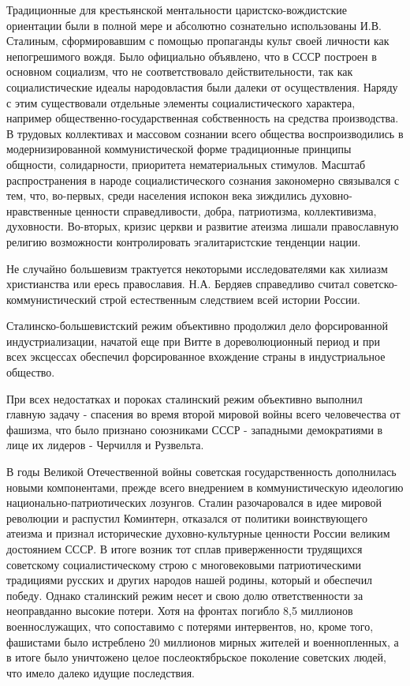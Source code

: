 \documentclass{article}
\begin{document}
Традиционные для крестьянской ментальности царистско-вождистские ориентации были в полной мере и абсолютно сознательно использованы И.В. Сталиным, сформировавшим с помощью пропаганды культ своей личности как непогрешимого вождя. Было официально объявлено, что в СССР построен в основном социализм, что не соответствовало действительности, так как социалистические идеалы народовластия были далеки от осуществления. Наряду с этим существовали отдельные элементы социалистического характера, например общественно-государственная собственность на средства производства. В трудовых коллективах и массовом сознании всего общества воспроизводились в модернизированной коммунистической форме традиционные принципы общности, солидарности, приоритета нематериальных стимулов. Масштаб распространения в народе социалистического сознания закономерно связывался с тем, что, во-первых, среди населения испокон века зиждились духовно-нравственные ценности справедливости, добра, патриотизма, коллективизма, духовности. Во-вторых, кризис церкви и развитие атеизма лишали православную религию возможности контролировать эгалитаристские тенденции нации.

\hfill

Не случайно большевизм трактуется некоторыми исследователями как хилиазм христианства или ересь православия. Н.А. Бердяев справедливо считал советско-коммунистический строй естественным следствием всей истории России.

\hfill

Сталинско-большевистский режим объективно продолжил дело форсированной индустриализации, начатой еще при Витте в дореволюционный период и при всех эксцессах обеспечил форсированное вхождение страны в индустриальное общество.

\hfill

При всех недостатках и пороках сталинский режим объективно выполнил главную задачу - спасения во время второй мировой войны всего человечества от фашизма, что было признано союзниками СССР - западными демократиями в лице их лидеров - Черчилля и Рузвельта.

\hfill

В годы Великой Отечественной войны советская государственность дополнилась новыми компонентами, прежде всего внедрением в коммунистическую идеологию национально-патриотических лозунгов. Сталин разочаровался в идее мировой революции и распустил Коминтерн, отказался от политики воинствующего атеизма и признал исторические духовно-культурные ценности России великим достоянием СССР. В итоге возник тот сплав приверженности трудящихся советскому социалистическому строю с многовековыми патриотическими традициями русских и других народов нашей родины, который и обеспечил победу. Однако сталинский режим несет и свою долю ответственности за неоправданно высокие потери. Хотя на фронтах погибло 8,5 миллионов военнослужащих, что сопоставимо с потерями интервентов, но, кроме того, фашистами было истреблено 20 миллионов мирных жителей и военнопленных, а в итоге было уничтожено целое послеоктябрьское поколение советских людей, что имело далеко идущие последствия.
\end{document}
